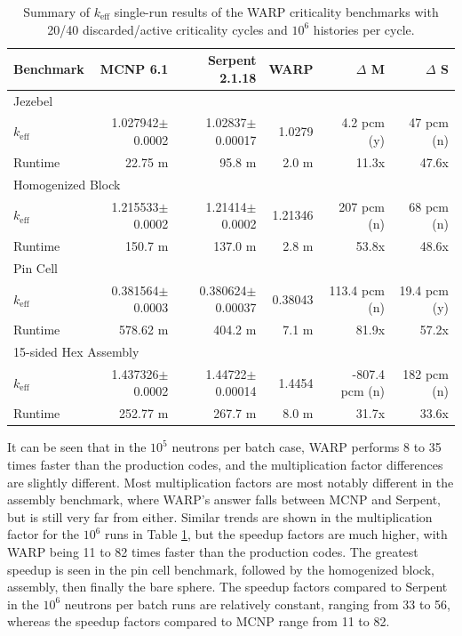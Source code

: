 \begin{table}[h]
\centering
\caption{Summary of $k_\mathrm{eff}$ single-run results of the WARP criticality benchmarks with 20/40 discarded/active criticality cycles and $10^6$ histories per cycle.}
\label{benchmark_summary_6}
\begin{tabular}{| l | r | r | r | r | r |}
 \hline
 Benchmark & MCNP 6.1 & Serpent 2.1.18 & WARP & $\Delta$ M & $\Delta$ S  \\
\hline
\hline
\multicolumn{6}{|l|}{Jezebel}  \\
\hline
 $k_\mathrm{eff}$ & 1.027942$\pm$0.0002 & 1.02837$\pm$0.00017 & 1.0279 & 4.2 pcm (y) & 47 pcm  (n) \\
 \hline
 Runtime               & 22.75 m & 95.8 m &  2.0 m & 11.3x  & 47.6x  \\
 \hline
 \hline
\multicolumn{6}{|l|}{Homogenized Block }\\
\hline
 $k_\mathrm{eff}$ & 1.215533$\pm$0.0002 & 1.21414$\pm$0.0002 & 1.21346 & 207 pcm (n) &  68 pcm (n)  \\
 \hline
 Runtime               & 150.7 m & 137.0 m & 2.8 m & 53.8x & 48.6x  \\
 \hline
  \hline
\multicolumn{6}{|l|}{Pin Cell}\\
\hline
 $k_\mathrm{eff}$ & 0.381564$\pm$0.0003 & 0.380624$\pm$0.00037 & 0.38043 & 113.4 pcm (n) &  19.4 pcm (y)  \\
 \hline
 Runtime               & 578.62 m & 404.2 m & 7.1 m & 81.9x & 57.2x \\
 \hline
  \hline
\multicolumn{6}{|l|}{15-sided Hex Assembly}\\
\hline
 $k_\mathrm{eff}$ & 1.437326$\pm$0.0002 & 1.44722$\pm$0.00014 & 1.4454 & -807.4 pcm (n) &  182 pcm (n) \\
 \hline
 Runtime               & 252.77 m & 267.7 m & 8.0 m & 31.7x & 33.6x \\
 \hline
\end{tabular}
\end{table}

It can be seen that in the $10^5$ neutrons per batch case, WARP performs 8 to 35 times faster than the production codes, and the multiplication factor differences are slightly different.  Most multiplication factors are most notably different in the assembly benchmark, where WARP's answer falls between MCNP and Serpent, but is still very far from either.  Similar trends are shown in the multiplication factor for the $10^6$ runs in Table \ref{benchmark_summary_6}, but the speedup factors are much higher, with WARP being 11 to 82 times faster than the production codes.   The greatest speedup is seen in the pin cell benchmark, followed by the homogenized block, assembly, then finally the bare sphere.  The speedup factors compared to Serpent in the $10^6$ neutrons per batch runs are relatively constant, ranging from 33 to 56, whereas the speedup factors compared to MCNP range from 11 to 82.

